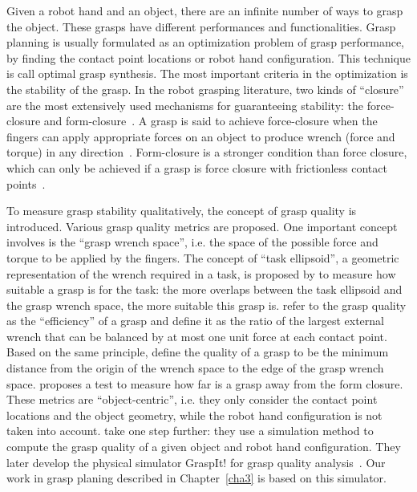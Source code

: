 Given a robot hand and an object, there are an infinite number of ways to grasp the object. These grasps have different performances and functionalities. Grasp planning is usually formulated as an optimization problem of grasp performance, by finding the contact point locations or robot hand configuration. This technique is call optimal grasp synthesis. The most important criteria in the optimization is the stability of the grasp. In the robot grasping literature, two kinds of ``closure'' are the most extensively used mechanisms for guaranteeing stability: the force-closure and form-closure~\citep{Nguyen87}. A grasp is said to achieve force-closure when the fingers can apply appropriate forces on an object to produce wrench (force and torque) in any direction~\citep{SalisburyJr1985}. Form-closure is a stronger condition than force closure, which can only be achieved if a grasp is force closure with frictionless contact points~\citep{diziouglu1984mechanics}.

To measure grasp stability qualitatively, the concept of grasp quality is introduced. Various grasp quality metrics are proposed. One important concept involves is the ``grasp wrench space'', i.e. the space of the possible force and torque to be applied by the fingers.
The concept of ``task ellipsoid'', a geometric representation of the wrench required in a task, is proposed by \citet{li1988task} to measure how suitable a grasp is for the task: the more overlaps between the task ellipsoid and the grasp wrench space, the more suitable this grasp is.
\citet{kirkpatrick1992quantitative} refer to the grasp quality as the ``efficiency'' of a grasp and define it as the ratio of the largest external wrench that can be balanced by at most one unit force at each contact point. Based on the same principle, \citet{ferrari1992planning} define the quality of a grasp to be the minimum distance from the origin of the wrench space to the edge of the grasp wrench space.
\citet{trinkle1992stability} proposes a test to measure how far is a grasp away from the form closure.
These metrics are ``object-centric'', i.e. they only consider the contact point locations and the object geometry, while the robot hand configuration is not taken into account. \citet{miller1999examples} take one step further: they use a simulation method to compute the grasp quality of a given object and robot hand configuration. They later develop the physical simulator GraspIt! for grasp quality analysis~\citep{miller2004graspit}. Our work in grasp planing described in Chapter~\ref{cha3} is based on this simulator.

